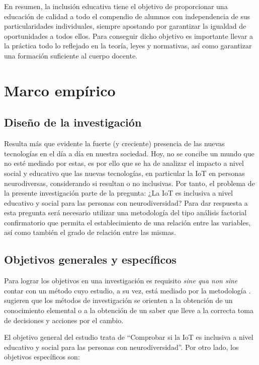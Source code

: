 \documentclass[spanish]{textolivre}
\begin{document}
En resumen, la inclusión educativa tiene el objetivo de proporcionar una educación de calidad a todo el compendio de alumnos con independencia de sus particularidades individuales, siempre apostando por garantizar la igualdad de oportunidades a todos ellos. Para conseguir dicho objetivo es importante llevar a la práctica todo lo reflejado en la teoría, leyes y normativas, así como garantizar una formación suficiente al cuerpo docente.

\section{Marco empírico}

\subsection{Diseño de la investigación}

Resulta más que evidente la fuerte (y creciente) presencia de las nuevas tecnologías en el día a día en nuestra sociedad. Hoy, no se concibe un mundo que no esté mediado por estas, es por ello que se ha de analizar el impacto a nivel social y educativo que las nuevas tecnologías, en particular la IoT en personas neurodiversas, considerando si resultan o no inclusivas. Por tanto, el problema de la presente investigación parte de la pregunta: ¿La IoT es inclusiva a nivel educativo y social para las personas con neurodiversidad? Para dar respuesta a esta pregunta será necesario utilizar una metodología del tipo análisis factorial confirmatorio que permita el establecimiento de una relación entre las variables, así como también el grado de relación entre las mismas.

\subsection{Objetivos generales y específicos}

Para lograr los objetivos en una investigación es requisito \textit{sine qua non sine} contar con un método cuyo estudio, a su vez, está mediado por la metodología \cite{romero_motivar_2009}. \textcite{bisquerra-alzina_metodologiinvestigacion_2004} sugieren que los métodos de investigación se orienten a la obtención de un conocimiento elemental o a la obtención de un saber que lleve a la correcta toma de decisiones y acciones por el cambio.

El objetivo general del estudio trata de “Comprobar si la IoT es inclusiva a nivel educativo y social para las personas con neurodiversidad”. Por otro lado, los objetivos específicos son:
\end{document}
